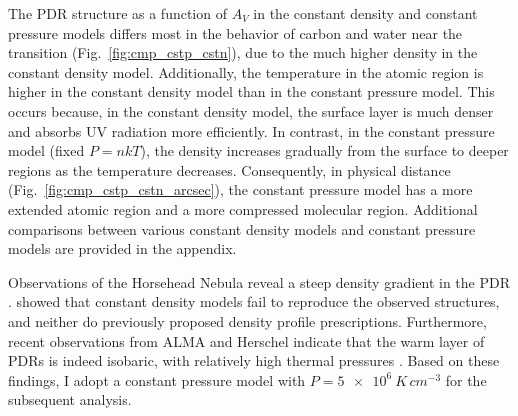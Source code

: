 \documentclass[12pt,a4paper]{article}
\newcommand{\qt}[1]{}
\begin{document}


The PDR structure as a function of $A_V$ in the constant density and constant pressure models differs most in the behavior of carbon and water near the  transition (Fig.~\ref{fig:cmp_cstp_cstn}), due to the much higher density in the constant density model. Additionally, the temperature in the atomic region is higher in the constant density model than in the constant pressure model. This occurs because, in the constant density model, the surface layer is much denser and absorbs UV radiation more efficiently. In contrast, in the constant pressure model (fixed $P = nkT$), the density increases gradually from the surface to deeper regions as the temperature decreases. Consequently, in physical distance (Fig.~\ref{fig:cmp_cstp_cstn_arcsec}), the constant pressure model has a more extended atomic region and a more compressed molecular region. Additional comparisons between various constant density models and constant pressure models are provided in the appendix.

Observations of the Horsehead Nebula reveal a steep density gradient in the PDR \parencite{Habart2005,Guzmán2011}. \textcite{HernándezVera2023} showed that constant density models fail to reproduce the observed structures, and neither do previously proposed density profile prescriptions. Furthermore, recent observations from ALMA and Herschel indicate that the warm layer of PDRs is indeed isobaric, with relatively high thermal pressures \parencite{Marconi1998,Goicoechea2016,Joblin2018,Wu2018,Bron2018,Maillard2021}. Based on these findings, I adopt a constant pressure model with $P = \qty{5e6}{K\,cm^{-3}}$ for the subsequent analysis.
\end{document}
